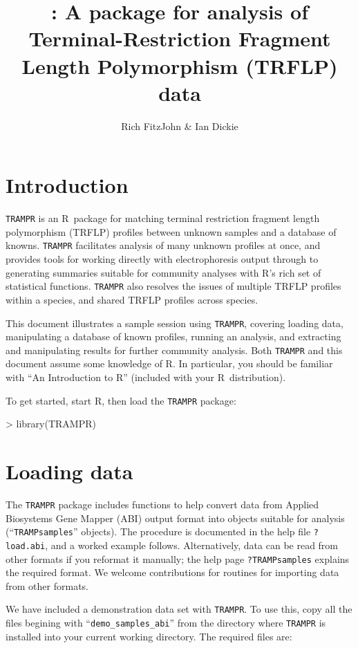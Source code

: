 \documentclass[a4paper]{article}
\title{\code{TRAMPR}: A package for analysis of Terminal-Restriction
  Fragment Length Polymorphism (TRFLP) data}
\author{Rich FitzJohn \& Ian Dickie}
\newcommand\code\texttt
\newcommand\R{\textsf{R}}
\newcommand{\help}[1]{\texttt{?#1}}
\begin{document}
\maketitle

\section{Introduction}

\code{TRAMPR} is an \R\ package for matching terminal restriction
fragment length polymorphism (TRFLP) profiles between unknown samples
and a database of knowns.  \code{TRAMPR} facilitates analysis of many
unknown profiles at once, and provides tools for working directly with
electrophoresis output through to generating summaries suitable for
community analyses with \R's rich set of statistical functions.
\code{TRAMPR} also resolves the issues of multiple TRFLP profiles
within a species, and shared TRFLP profiles across species.

This document illustrates a sample session using \code{TRAMPR},
covering loading data, manipulating a database of known profiles,
running an analysis, and extracting and manipulating results for
further community analysis.  Both \code{TRAMPR} and this document
assume some knowledge of \R.  In particular, you should be familiar
with ``An Introduction to R'' (included with your \R\ distribution).

To get started, start R, then load the \code{TRAMPR} package:
\begin{Schunk}
\begin{Sinput}
> library(TRAMPR)
\end{Sinput}
\end{Schunk}

\section{Loading data}
\label{sec:load}

The \code{TRAMPR} package includes functions to help convert data from
Applied Biosystems Gene Mapper (ABI) output format into objects
suitable for analysis (``\code{TRAMPsamples}'' objects).  The
procedure is documented in the help file \help{load.abi}, and a
worked example follows.  Alternatively, data can be read from other
formats if you reformat it manually; the help page
\help{TRAMPsamples} explains the required format.  We welcome
contributions for routines for importing data from other formats.

We have included a demonstration data set with \code{TRAMPR}.  To use
this, copy all the files begining with ``\code{demo\_samples\_abi}''
from the directory where \code{TRAMPR} is installed into your current
working directory.  The required files are:
\end{document}
